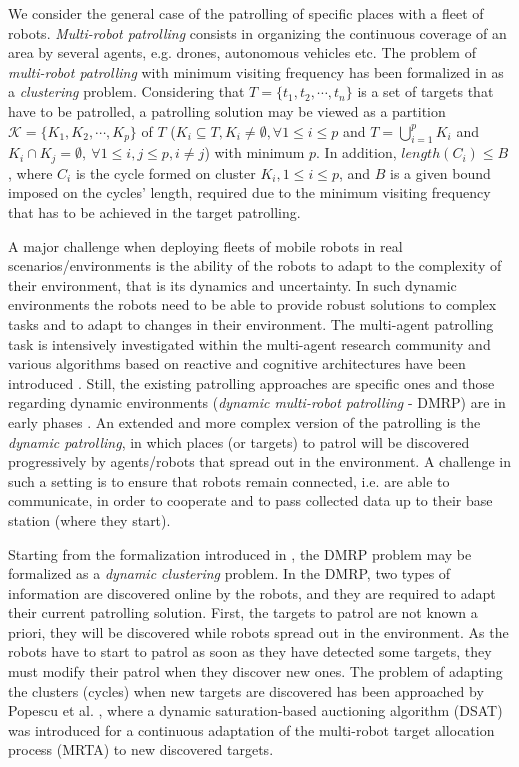 We consider the general case of the patrolling of specific places with a fleet of robots.  \emph{Multi-robot patrolling} consists in organizing the continuous coverage of an area by several agents, e.g. drones, autonomous vehicles etc. The problem of \emph{multi-robot patrolling} with minimum visiting frequency has been formalized in \cite{8} as a \emph{clustering} problem. Considering that $T=\{t_1, t_2,\cdots, t_n\}$ is a set of targets that have to be patrolled, a patrolling solution may be viewed as a partition $\mathcal{K}=\{K_1, K_2, \cdots, K_p\}$ of $T$ ($K_i \subseteq T, K_i \neq \emptyset, \forall 1 \leq i \leq p$ and $T =\displaystyle\bigcup_{i=1}^{p} K_i$ and  $K_i \cap K_j =\emptyset, \ \forall 1 \leq i, j \leq p, i \neq j $) with minimum $p$. In addition, $length(C_i) \leq B$, where $C_i$ is the cycle formed on cluster $K_i, 1\leq i \leq p$, and $B$ is a given bound imposed on the cycles' length,  required  due  to  the  minimum  visiting  frequency that has to be achieved in the target patrolling.


A major challenge when deploying fleets of mobile robots in real scenarios/environments is  the ability of the robots to adapt to the complexity of their environment, that is its dynamics and uncertainty. In such dynamic environments the robots need to be able to provide robust solutions to complex tasks and to adapt to changes in their environment. The multi-agent patrolling task is intensively investigated within the multi-agent research community and various algorithms based on reactive and cognitive architectures have been introduced \cite{othmaniguibourg18}. Still, the existing patrolling approaches are specific ones and those regarding dynamic environments  (\emph{dynamic multi-robot patrolling} - DMRP) are in early phases \cite{othmaniguibourg18}.  
An extended and more complex version of the patrolling is the \emph{dynamic patrolling}, in which places (or targets) to patrol will be discovered progressively by agents/robots that spread out in the environment. A challenge in such a setting  is to ensure that robots remain connected, i.e. are able to communicate, in order to cooperate and to pass collected data up to their base station (where they start). 

Starting from the formalization introduced in \cite{8}, the DMRP problem may be formalized as a \emph{dynamic clustering} problem. In the DMRP, two types of information are discovered online by the robots, and they are  required to adapt their current patrolling solution. First, the targets to patrol are not known a priori, they will be discovered while robots spread out in the environment. As the robots have to start to patrol as soon as they have detected some targets, they must modify their patrol when they discover new ones. The problem of adapting the clusters (cycles) when new targets are discovered has been approached by Popescu et al. \cite{dmap2018}, where a dynamic saturation-based auctioning algorithm (DSAT) was introduced  for a continuous adaptation of the multi-robot target allocation process (MRTA) to new discovered targets.

